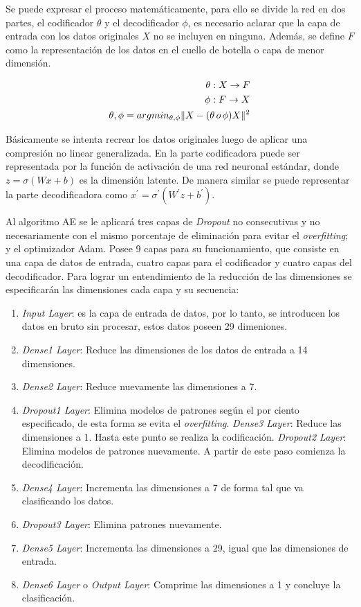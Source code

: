     Se puede expresar el proceso matem\'{a}ticamente, para ello se divide la red en dos partes, el codificador $\theta$ y el decodificador $\phi$, es necesario aclarar que la capa de entrada con los datos originales $X$ no se incluyen en ninguna. Adem\'{a}s, se define $F$ como la representaci\'{o}n de los datos en el cuello de botella o capa de menor dimensi\'{o}n.
    
    \begin{align}
    	\theta:X\rightarrow F \\
    	\phi:F\rightarrow X \\
    	\theta,\phi=argmin_{\theta,\phi}\| X-(\theta \thinspace o \thinspace \phi)X\|^{2}   
    \end{align}
    
    B\'{a}sicamente se intenta recrear los datos originales luego de aplicar una compresi\'{o}n no linear generalizada. En la parte codificadora puede ser representada por la funci\'{o}n de activaci\'{o}n de una red neuronal est\'{a}ndar, donde $z=\sigma(Wx+b)$ es la dimensi\'{o}n latente. De manera similar se puede representar la parte decodificadora como $x^{'}=\sigma^{'} (W^{'} z+b^{'})$.
    
    Al algoritmo AE se le aplicar\'{a} tres capas de \textit{Dropout} no consecutivas y no necesariamente con el mismo porcentaje de eliminaci\'{o}n para evitar el \textit{overfitting}; y el optimizador Adam. Posee 9 capas para su funcionamiento, que consiste en una capa de datos de entrada, cuatro capas para el codificador y cuatro capas del decodificador. Para lograr un entendimiento de la reducci\'{o}n de las dimensiones se especificar\'{a}n las dimensiones cada capa y su secuencia:
    
    \begin{enumerate}
    	\item \textit{Input Layer}: es la capa de entrada de datos, por lo tanto, se introducen los datos en bruto sin procesar, estos datos poseen 29 dimeniones.
    	\item \textit{Dense1 Layer}: Reduce las dimensiones de los datos de entrada a 14 dimensiones.
    	\item \textit{Dense2 Layer}: Reduce nuevamente las dimensiones a 7.
    	\item \textit{Dropout1 Layer}: Elimina modelos de patrones seg\'{u}n el por ciento especificado, de esta forma se evita el \textit{overfitting}.
    	\textit{Dense3 Layer}: Reduce las dimensiones a 1. Hasta este punto se realiza la codificaci\'{o}n.
    	\textit{Dropout2 Layer}: Elimina modelos de patrones nuevamente. A partir de este paso comienza la decodificaci\'{o}n.
    	\item \textit{Dense4 Layer}: Incrementa las dimensiones a 7 de forma tal que va clasificando los datos.
    	\item \textit{Dropout3 Layer}: Elimina patrones nuevamente.
    	\item \textit{Dense5 Layer}: Incrementa las dimensiones a 29, igual que las dimensiones de entrada.
    	\item \textit{Dense6 Layer} o \textit{Output Layer}: Comprime las dimensiones a 1 y concluye la clasificaci\'{o}n.
    \end{enumerate}

